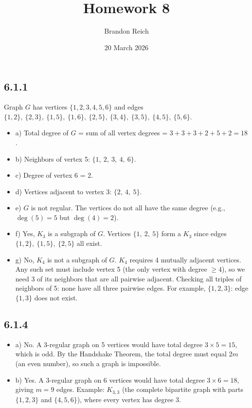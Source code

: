 \documentclass{article}
\title{Homework 8}
\author{Brandon Reich}
\date{20 March 2026}
\begin{document}
\maketitle

\subsection*{6.1.1}
Graph $G$ has vertices $\{1,2,3,4,5,6\}$ and edges $\{1,2\},\ \{2,3\},\ \{1,5\},\ \{1,6\},\ \{2,5\},\ \{3,4\},\ \{3,5\},\ \{4,5\},\ \{5,6\}$.
\begin{itemize}
    \item a) Total degree of $G$ = sum of all vertex degrees = $3+3+3+2+5+2 = 18$.
    \item b) Neighbors of vertex 5: $\{1,\ 2,\ 3,\ 4,\ 6\}$.
    \item c) Degree of vertex 6 = 2.
    \item d) Vertices adjacent to vertex 3: $\{2,\ 4,\ 5\}$.
    \item e) $G$ is not regular. The vertices do not all have the same degree (e.g., $\deg(5) = 5$ but $\deg(4) = 2$).
    \item f) Yes, $K_3$ is a subgraph of $G$. Vertices $\{1,\ 2,\ 5\}$ form a $K_3$ since edges $\{1,2\},\ \{1,5\},\ \{2,5\}$ all exist.
    \item g) No, $K_4$ is not a subgraph of $G$. $K_4$ requires 4 mutually adjacent vertices. Any such set must include vertex 5 (the only vertex with degree $\ge 4$), so we need 3 of its neighbors that are all pairwise adjacent. Checking all triples of neighbors of 5: none have all three pairwise edges. For example, $\{1,2,3\}$: edge $\{1,3\}$ does not exist.
\end{itemize}

\subsection*{6.1.4}
\begin{itemize}
    \item a) No. A 3-regular graph on 5 vertices would have total degree $3 \times 5 = 15$, which is odd. By the Handshake Theorem, the total degree must equal $2m$ (an even number), so such a graph is impossible.
    \item b) Yes. A 3-regular graph on 6 vertices would have total degree $3 \times 6 = 18$, giving $m = 9$ edges. Example: $K_{3,3}$ (the complete bipartite graph with parts $\{1,2,3\}$ and $\{4,5,6\}$), where every vertex has degree 3.
\end{itemize}
\end{document}
